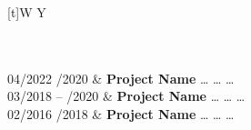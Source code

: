 \begin{xltabular}{\textwidth}[t]{W Y}

 \hrulefill \\ \\ 

04/2022 /2020 			&	\textbf{Project Name} \newline
						\dots \newline
						\dots \newline
						\dots \newline
						\\
					
03/2018 – /2020 			&	\textbf{Project Name} \newline
						\dots \newline
						\dots \newline
						\dots \newline
						\\
					
02/2016 /2018 			&	\textbf{Project Name} \newline
						\dots \newline
						\dots \newline
						\dots \newline
						\\

\end{xltabular}

